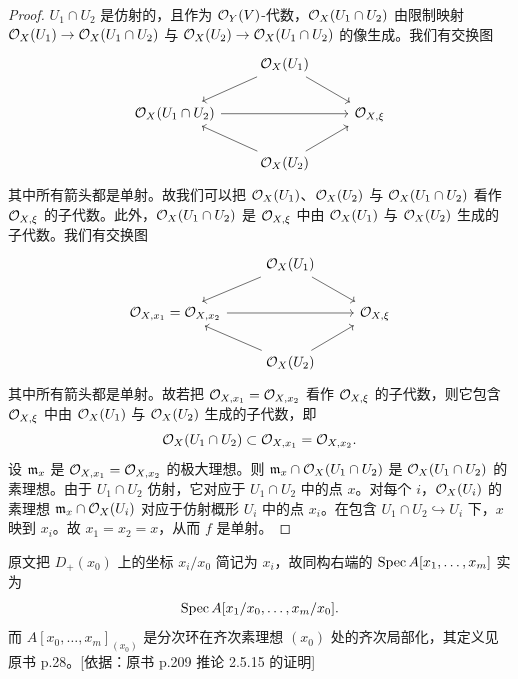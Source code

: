 \begin{proof}
$U_1\cap U_2$ 是仿射的，且作为 $\mathcal{O}_Y(V)$-代数，$\mathcal{O}_X(U_1\cap U_2)$ 由限制映射 $\mathcal{O}_X(U_1)\to\mathcal{O}_X(U_1\cap U_2)$ 与 $\mathcal{O}_X(U_2)\to\mathcal{O}_X(U_1\cap U_2)$ 的像生成。我们有交换图
\[
\begin{tikzcd}
& \cO_X(U_1)\arrow[dl]\arrow[dr] &\\
\cO_X(U_1\cap U_2)\arrow[rr] & & \cO_{X,\xi}\\
& \cO_X(U_2)\arrow[ul]\arrow[ur] &
\end{tikzcd}
\]
其中所有箭头都是单射。故我们可以把 $\mathcal{O}_X(U_1)$、$\mathcal{O}_X(U_2)$ 与 $\mathcal{O}_X(U_1\cap U_2)$ 看作 $\mathcal{O}_{X,\xi}$ 的子代数。此外，$\mathcal{O}_X(U_1\cap U_2)$ 是 $\mathcal{O}_{X,\xi}$ 中由 $\mathcal{O}_X(U_1)$ 与 $\mathcal{O}_X(U_2)$ 生成的子代数。我们有交换图
\[
\begin{tikzcd}
& \cO_X(U_1)\arrow[dl]\arrow[dr] &\\
\cO_{X,x_1}=\cO_{X,x_2}\arrow[rr] & & \cO_{X,\xi}\\
& \cO_X(U_2)\arrow[ul]\arrow[ur] &
\end{tikzcd}
\]
其中所有箭头都是单射。故若把 $\mathcal{O}_{X,x_1}=\mathcal{O}_{X,x_2}$ 看作 $\mathcal{O}_{X,\xi}$ 的子代数，则它包含 $\mathcal{O}_{X,\xi}$ 中由 $\mathcal{O}_X(U_1)$ 与 $\mathcal{O}_X(U_2)$ 生成的子代数，即
\[
\mathcal{O}_X(U_1\cap U_2)\subset\mathcal{O}_{X,x_1}=\mathcal{O}_{X,x_2}.
\]
设 $\mathfrak{m}_x$ 是 $\mathcal{O}_{X,x_1}=\mathcal{O}_{X,x_2}$ 的极大理想。则 $\mathfrak{m}_x\cap\mathcal{O}_X(U_1\cap U_2)$ 是 $\mathcal{O}_X(U_1\cap U_2)$ 的素理想。由于 $U_1\cap U_2$ 仿射，它对应于 $U_1\cap U_2$ 中的点 $x$。对每个 $i$，$\mathcal{O}_X(U_i)$ 的素理想 $\mathfrak{m}_x\cap\mathcal{O}_X(U_i)$ 对应于仿射概形 $U_i$ 中的点 $x_i$。在包含 $U_1\cap U_2\hookrightarrow U_i$ 下，$x$ 映到 $x_i$。故 $x_1=x_2=x$，从而 $f$ 是单射。
\end{proof}

\begin{tnote}
原文把 $D_+(x_0)$ 上的坐标 $x_i/x_0$ 简记为 $x_i$，故同构右端的 $\operatorname{Spec} A[x_1,\dots,x_m]$ 实为
\[
\operatorname{Spec} A[x_1/x_0,\dots,x_m/x_0].
\]
而 $A[x_0,\dots,x_m]_{(x_0)}$ 是分次环在齐次素理想 $(x_0)$ 处的齐次局部化，其定义见原书 p.28。[依据：原书 p.209 推论 2.5.15 的证明]
\end{tnote}
